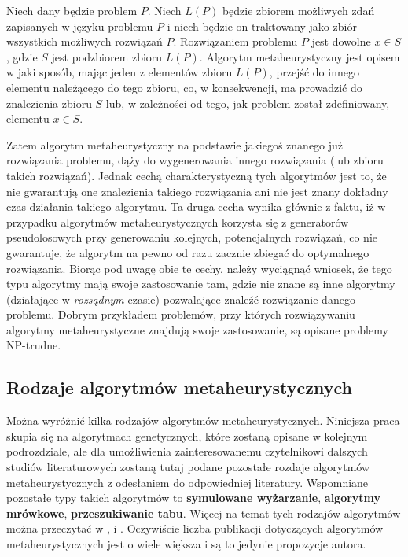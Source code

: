 \begin{definition}
Niech dany będzie problem $P$. Niech $L(P)$ będzie zbiorem możliwych zdań zapisanych w języku problemu $P$ i niech będzie on traktowany jako zbiór wszystkich możliwych rozwiązań $P$. Rozwiązaniem problemu $P$ jest dowolne $x \in S$, gdzie $S$ jest podzbiorem zbioru $L(P)$. Algorytm metaheurystyczny jest opisem w jaki sposób, mając jeden z elementów zbioru $L(P)$, przejść do innego elementu należącego do tego zbioru, co, w konsekwencji, ma prowadzić do znalezienia zbioru $S$ lub, w zależności od tego, jak problem został zdefiniowany, elementu $x \in S$.
\end{definition}

Zatem algorytm metaheurystyczny na podstawie jakiegoś znanego już rozwiązania problemu, dąży do wygenerowania innego rozwiązania (lub zbioru takich rozwiązań). Jednak cechą charakterystyczną tych algorytmów jest to, że nie gwarantują one znalezienia takiego rozwiązania ani nie jest znany dokładny czas działania takiego algorytmu. Ta druga cecha wynika głównie z faktu, iż w przypadku algorytmów metaheurystycznych korzysta się z generatorów pseudolosowych przy generowaniu kolejnych, potencjalnych rozwiązań, co nie gwarantuje, że algorytm na pewno od razu zacznie zbiegać do optymalnego rozwiązania. Biorąc pod uwagę obie te cechy, należy wyciągnąć wniosek, że tego typu algorytmy mają swoje zastosowanie tam, gdzie nie znane są inne algorytmy (działające w \textit{rozsądnym} czasie) pozwalające znaleźć rozwiązanie danego problemu. Dobrym przykładem problemów, przy których rozwiązywaniu algorytmy metaheurystyczne znajdują swoje zastosowanie, są opisane problemy NP-trudne.

\subsection{Rodzaje algorytmów metaheurystycznych}

Można wyróżnić kilka rodzajów algorytmów metaheurystycznych. Niniejsza praca skupia się na algorytmach genetycznych, które zostaną opisane w kolejnym podrozdziale, ale dla umożliwienia zainteresowanemu czytelnikowi dalszych studiów literaturowych zostaną tutaj podane pozostałe rozdaje algorytmów metaheurystycznych z odesłaniem do odpowiedniej literatury. Wspomniane pozostałe typy takich algorytmów to \textbf{symulowane wyżarzanie}, \textbf{algorytmy mrówkowe}, \textbf{przeszukiwanie tabu}. Więcej na temat tych rodzajów algorytmów można przeczytać w \cite{SimulatedAnnealing}, \cite{Ant} i \cite{TabuSearch}. Oczywiście liczba publikacji dotyczących algorytmów metaheurystycznych jest o wiele większa i są to jedynie propozycje autora.

